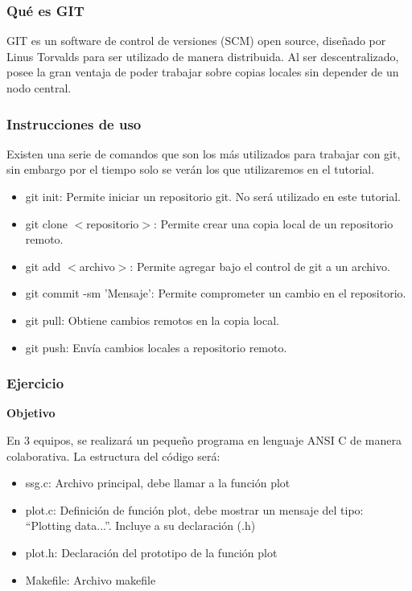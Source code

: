 \subsubsection{Qué es GIT}

GIT es un software de control de versiones (SCM) open source, diseñado por Linus Torvalds para ser utilizado de manera distribuida. Al ser descentralizado, posee
la gran ventaja de poder trabajar sobre copias locales sin depender de un nodo central.

\subsubsection{Instrucciones de uso}

Existen una serie de comandos que son los más utilizados para trabajar con git, sin embargo por el tiempo solo se verán los que utilizaremos en el tutorial.

\begin{itemize}
    \item git init: Permite iniciar un repositorio git. No será utilizado en este tutorial.
    \item git clone $<$repositorio$>$: Permite crear una copia local de un repositorio remoto.
    \item git add $<$archivo$>$: Permite agregar bajo el control de git a un archivo.
    \item git commit -sm 'Mensaje': Permite comprometer un cambio en el repositorio.
    \item git pull: Obtiene cambios remotos en la copia local.
    \item git push: Envía cambios locales a repositorio remoto.
\end{itemize}


\subsubsection{Ejercicio}

\textbf{Objetivo}

 En 3 equipos, se realizará un pequeño programa en lenguaje ANSI C de manera colaborativa. La estructura del código será:

\begin{itemize}
    \item ssg.c: Archivo principal, debe llamar a la función plot
    \item plot.c: Definición de función plot, debe mostrar un mensaje del tipo: ``Plotting data...''. Incluye a su declaración (.h)
    \item plot.h: Declaración del prototipo de la función plot
    \item Makefile: Archivo makefile
\end{itemize}

